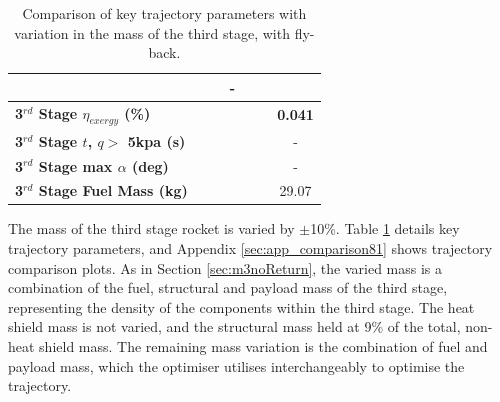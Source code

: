 \begin{table}[ht]
\begin{tabular}{l c c c c c c}
		& \returnFuelmThreeOneHundredFive
		& \returnFuelmThreeOneHundredTen
		& -
		\\
		\hline 
		\textbf{3$^{rd}$ Stage $\eta_{exergy}$ (\%)}
		& \textbf{\thirddExergyEffmThreeNinety}
		& \textbf{\thirddExergyEffmThreeNinetyFive}
		& \textbf{\thirddExergyEffmThreeStandard}
		& \textbf{\thirddExergyEffmThreeOneHundredFive}
		& \textbf{\thirddExergyEffmThreeOneHundredTen}
		& \textbf{0.041}
		\\
		\textbf{3$^{rd}$ Stage $t$, $q >$ 5kpa (s)}
		& \thirdqOverFivemThreeNinety
		& \thirdqOverFivemThreeNinetyFive
		& \thirdqOverFivemThreeStandard
		& \thirdqOverFivemThreeOneHundredFive
		& \thirdqOverFivemThreeOneHundredTen
		& -
		\\
		\textbf{3$^{rd}$ Stage max $\alpha$ (deg)}
		& \thirdmaxAoAmThreeNinety
		& \thirdmaxAoAmThreeNinetyFive
		& \thirdmaxAoAmThreeStandard
		& \thirdmaxAoAmThreeOneHundredFive
		& \thirdmaxAoAmThreeOneHundredTen
		& -
		\\
		\textbf{3$^{rd}$ Stage Fuel Mass (kg)}
		& \thirdmFuelmThreeNinety
		& \thirdmFuelmThreeNinetyFive
		& \thirdmFuelmThreeStandard
		& \thirdmFuelmThreeOneHundredFive
		& \thirdmFuelmThreeOneHundredTen
		&29.07
		\\
		\hline 
	\end{tabular} 
	\caption{Comparison of key trajectory parameters with variation in the mass of the third stage, with fly-back.}
	\label{tab:comparison81}
\end{table}

The mass of the third stage rocket is varied by $\pm$10\%. Table \ref{tab:comparison81} details key trajectory parameters, and Appendix \ref{sec:app_comparison81} shows trajectory comparison plots. As in Section \ref{sec:m3noReturn}, the varied mass is a combination of the fuel, structural and payload mass of the third stage, representing the density of the components within the third stage. The heat shield mass is not varied, and the structural mass held at 9\% of the total, non-heat shield mass. The remaining mass variation is the combination of fuel and payload mass, which the optimiser utilises interchangeably to optimise the trajectory.

